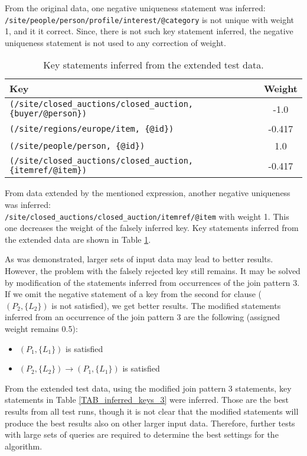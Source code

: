From the original data, one negative uniqueness statement was inferred:\\
\texttt{/site/people/person/profile/interest/@category} is not unique with weight 1, and it it correct. Since, there is not such key statement inferred, the negative uniqueness statement is not used to any correction of weight.

\begin{table}
\label{TAB_inferred_keys_2}
\caption{Key statements inferred from the extended test data.}
\begin{tabular}{|l|c|}
\hline
\textbf{Key} & \textbf{Weight} \\ \hline \hline
\texttt{(/site/closed\_auctions/closed\_auction, \{buyer/@person\})} & -1.0 \\ \hline
\texttt{(/site/regions/europe/item, \{@id\})} & -0.417 \\ \hline
\texttt{(/site/people/person, \{@id\})} & 1.0 \\ \hline
\texttt{(/site/closed\_auctions/closed\_auction, \{itemref/@item\})} & -0.417 \\ \hline
\end{tabular}
\end{table}

From data extended by the mentioned expression, another negative uniqueness was inferred:\\
\texttt{/site/closed\_auctions/closed\_auction/itemref/@item} with weight 1. This one decreases the weight of the falsely inferred key. Key statements inferred from the extended data are shown in Table \ref{TAB_inferred_keys_2}.

As was demonstrated, larger sets of input data may lead to better results. However, the problem with the falsely rejected key still remains. It may be solved by modification of the statements inferred from occurrences of the join pattern 3. If we omit the negative statement of a key from the second for clause ($(P_2, \{L_2\})$ is not satisfied), we get better results. The modified statements inferred from an occurrence of the join pattern 3 are the following (assigned weight remains 0.5):

\begin{itemize}
\item $(P_1, \{L_1\})$ is satisfied
\item $(P_2, \{L_2\}) \rightarrow (P_1, \{L_1\})$ is satisfied
\end{itemize}

From the extended test data, using the modified join pattern 3 statements, key statements in Table \ref{TAB_inferred_keys_3} were inferred. Those are the best results from all test runs, though it is not clear that the modified statements will produce the best results also on other larger input data. Therefore, further tests with large sets of queries are required to determine the best settings for the algorithm. 

